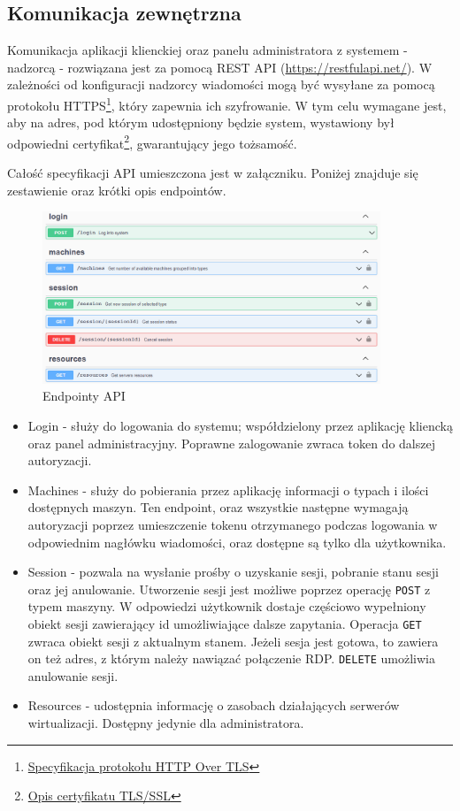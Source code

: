 \documentclass[../opis-rozwiazania.tex]{subfiles}
\begin{document}
\subsection{Komunikacja zewnętrzna}
\label{communication:api}
Komunikacja aplikacji klienckiej oraz panelu administratora z systemem - nadzorcą - rozwiązana jest za pomocą REST API (\url{https://restfulapi.net/}). W zależności od konfiguracji nadzorcy wiadomości mogą być wysyłane za pomocą protokołu HTTPS\footnote{\href{https://datatracker.ietf.org/doc/html/rfc2818}{Specyfikacja protokołu HTTP Over TLS}}, który zapewnia ich szyfrowanie. W tym celu wymagane jest, aby na adres, pod którym udostępniony będzie system, wystawiony był odpowiedni certyfikat\footnote{\href{https://protonmail.com/blog/tls-ssl-certificate/}{Opis certyfikatu TLS/SSL}}, gwarantujący jego tożsamość.

Całość specyfikacji API umieszczona jest w załączniku. Poniżej znajduje się zestawienie oraz krótki opis endpointów.

\begin{figure}[H]
  \centering
  \includegraphics[width=0.9\textwidth]{../api/endpoints.png}
  \caption{Endpointy API}
\end{figure}

\begin{itemize}
  \item Login - służy do logowania do systemu; współdzielony przez aplikację kliencką oraz panel administracyjny. Poprawne zalogowanie zwraca token do dalszej autoryzacji.
  \item Machines - służy do pobierania przez aplikację informacji o typach i ilości dostępnych maszyn. Ten endpoint, oraz wszystkie następne wymagają autoryzacji poprzez umieszczenie tokenu otrzymanego podczas logowania w odpowiednim nagłówku wiadomości, oraz dostępne są tylko dla użytkownika.
  \item Session - pozwala na wysłanie prośby o uzyskanie sesji, pobranie stanu sesji oraz jej anulowanie. Utworzenie sesji jest możliwe poprzez operację \texttt{POST} z typem maszyny. W odpowiedzi użytkownik dostaje częściowo wypełniony obiekt sesji zawierający id umożliwiające dalsze zapytania. Operacja \texttt{GET} zwraca obiekt sesji z aktualnym stanem. Jeżeli sesja jest gotowa, to zawiera on też adres, z którym należy nawiązać połączenie RDP. \texttt{DELETE} umożliwia anulowanie sesji.
  \item Resources - udostępnia informację o zasobach działających serwerów wirtualizacji. Dostępny jedynie dla administratora.
\end{itemize}
\end{document}

